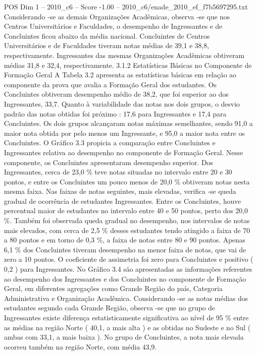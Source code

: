\begin{textsample}{POS Dim 1 – 2010\_c6 – Score -1.00 – 2010\_c6/enade\_2010\_ef\_f7b5697295.txt}
Considerando -se as demais Organizações Acadêmicas, observa -se que nos Centros Universitários e Faculdades, o desempenho de Ingressantes e de Concluintes ficou abaixo da média nacional.
Concluintes de Centros Universitários e de Faculdades tiveram notas médias de 39,1 e 38,8, respectivamente.
Ingressantes das mesmas Organizações Acadêmicas obtiveram médias 31,8 e 32,4, respectivamente. 3.1.2 Estatísticas Básicas no Componente de Formação Geral A Tabela 3.2 apresenta as estatísticas básicas em relação ao componente da prova que avalia a Formação Geral dos estudantes.
Os Concluintes obtiveram desempenho médio de 38,2, que foi superior ao dos Ingressantes, 33,7.
Quanto à variabilidade das notas nos dois grupos, o desvio padrão das notas obtidas foi próximo : 17,6 para Ingressantes e 17,4 para Concluintes.
Os dois grupos alcançaram notas máximas semelhantes, sendo 91,0 a maior nota obtida por pelo menos um Ingressante, e 95,0 a maior nota entre os Concluintes.
O Gráfico 3.3 propicia a comparação entre Concluintes e Ingressantes relativa ao desempenho no componente de Formação Geral.
Nesse componente, os Concluintes apresentaram desempenho superior.
Dos Ingressantes, cerca de 23,0 \% teve notas situadas no intervalo entre 20 e 30 pontos, e entre os Concluintes um pouco menos de 20,0 \% obtiveram notas nesta mesma faixa.
Nas faixas de notas seguintes, mais elevadas, verifica -se queda gradual de ocorrência de estudantes Ingressantes.
Entre os Concluintes, houve percentual maior de estudantes no intervalo entre 40 e 50 pontos, perto dos 20,0 \%.
Também foi observada queda gradual no desempenho, nos intervalos de notas mais elevados, com cerca de 2,5 \% desses estudantes tendo atingido a faixa de 70 a 80 pontos e em torno de 0,3 \%, a faixa de notas entre 80 e 90 pontos.
Apenas 6,1 \% dos Concluintes tiveram desempenho na menor faixa de notas, que vai de zero a 10 pontos.
O coeficiente de assimetria foi zero para Concluintes e positivo ( 0,2 ) para Ingressantes.
No Gráfico 3.4 são apresentadas as informações referentes ao desempenho dos Ingressantes e dos Concluintes no componente de Formação Geral, em diferentes agregações como Grande Região do país, Categoria Administrativa e Organização Acadêmica.
Considerando -se as notas médias dos estudantes segundo cada Grande Região, observa -se que no grupo de Ingressantes existe diferença estatisticamente significativa ao nível de 95 \% entre as médias na região Norte ( 40,1, a mais alta ) e as obtidas no Sudeste e no Sul ( ambas com 33,1, a mais baixa ).
No grupo de Concluintes, a nota mais elevada ocorreu também na região Norte, com média 43,9.

\end{textsample}
